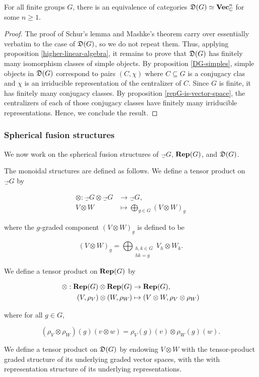 \begin{prop}\label{DG-is-vector-space} For all finite groups $G$, there is an equivalence of categories ${\mathfrak D}(G)\simeq {\bf Vec}_{{\mathbb C}}^n$ for some $n\geq 1$.
\end{prop}
\begin{proof} The proof of Schur's lemma and Mashke's theorem carry over essentially verbatim to the case of ${\mathfrak D}(G)$, so we do not repeat them. Thus, applying proposition \ref{higher-linear-algebra}, it remains to prove that ${\mathfrak D}(G)$ has finitely many isomorphism classes of simple objects. By proposition \ref{DG-simples}, simple objects in ${\mathfrak D}(G)$ correspond to pairs $(C,\chi)$ where $C\subseteq G$ is a conjugacy clas and $\chi$ is an irriducible representation of the centralizer of $C$. Since $G$ is finite, it has finitely many conjugacy classes. By proposition \ref{repG-is-vector-space}, the centralizers of each of those conjugacy classes have finitely many irriducible representations. Hence, we conclude the result.
\end{proof}

\subsubsection{Spherical fusion structures}

We now work on the spherical fusion structures of $\Vec_{G}$, ${\bf Rep}(G)$, and ${\mathfrak D}(G)$. 

\begin{defn}
The monoidal structures are defined as follows. We define a tensor product on $\Vec_G$ by

\begin{align*}
\otimes: \Vec_{G}\otimes \Vec_{G}&\to \Vec_{G},\\
V\otimes W&\mapsto \bigoplus_{g\in G}(V\otimes W)_g
\end{align*}

where the $g$-graded component $(V\otimes W)_g$ is defined to be 

$$(V\otimes W)_g=\bigoplus_{\substack{h,k\in G \\ hk=g}}V_h\otimes W_k.$$

We define a tensor product on ${\bf Rep}(G)$ by

\begin{align*}
\otimes: {\bf Rep}(G)\otimes {\bf Rep}(G)&\to {\bf Rep}(G),\\
(V,\rho_V)\otimes (W,\rho_W)&\mapsto (V\otimes W,\rho_{V}\otimes \rho_W)
\end{align*}

where for all $g\in G$,

$$(\rho_V\otimes \rho_W)(g)(v\otimes w)=\rho_V(g)(v)\otimes \rho_W(g)(w).$$

We define a tensor product on ${\mathfrak D}(G)$ by endowing $V\otimes W$ with the tensor-product graded structure of its underlying graded vector spaces, with the with representation structure of its underlying representations. 
\end{defn}

